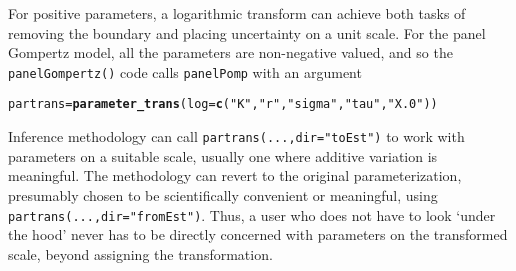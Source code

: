 \documentclass[12pt]{article}\usepackage[]{graphicx}\usepackage[table]{xcolor}
\makeatletter
\newcommand{\hlsng}[1]{\textcolor[rgb]{0.192,0.494,0.8}{#1}}%
\newcommand{\hldef}[1]{\textcolor[rgb]{0.345,0.345,0.345}{#1}}%
\newcommand{\hlkwb}[1]{\textcolor[rgb]{0.69,0.353,0.396}{#1}}%
\newcommand{\hlkwc}[1]{\textcolor[rgb]{0.333,0.667,0.333}{#1}}%
\newcommand{\hlkwd}[1]{\textcolor[rgb]{0.737,0.353,0.396}{\textbf{#1}}}%
\newenvironment{kframe}{%
 \def\at@end@of@kframe{}%
 \ifinner\ifhmode%
  \def\at@end@of@kframe{\end{minipage}}%
  \begin{minipage}{\columnwidth}%
 \fi\fi%
 \def\FrameCommand##1{\hskip\@totalleftmargin \hskip-\fboxsep
 \colorbox{shadecolor}{##1}\hskip-\fboxsep
     \hskip-\linewidth \hskip-\@totalleftmargin \hskip\columnwidth}%
 \MakeFramed {\advance\hsize-\width
   \@totalleftmargin\z@ \linewidth\hsize
   \@setminipage}}%
 {\par\unskip\endMakeFramed%
 \at@end@of@kframe}
\newenvironment{knitrout}{}{} %
\newcommand\code{\texttt}
\makeatother
\begin{document}
For positive parameters, a logarithmic transform can achieve both tasks of removing the boundary and placing uncertainty on a unit scale.
For the panel Gompertz model, all the parameters are non-negative valued, and so the \code{panelGompertz()} code calls \code{panelPomp} with an argument
\begin{knitrout}
\color{fgcolor}\begin{kframe}
\begin{alltt}
\hldef{partrans}\hlkwb{=}\hlkwd{parameter_trans}\hldef{(}\hlkwc{log}\hldef{=}\hlkwd{c}\hldef{(}\hlsng{"K"}\hldef{,}\hlsng{"r"}\hldef{,}\hlsng{"sigma"}\hldef{,}\hlsng{"tau"}\hldef{,}\hlsng{"X.0"}\hldef{))}
\end{alltt}
\end{kframe}
\end{knitrout}
Inference methodology can call \code{partrans(...,dir="toEst")} to work with parameters on a suitable scale, usually one where additive variation is meaningful.
The methodology can revert to the original parameterization, presumably chosen to be scientifically convenient or meaningful, using  \code{partrans(...,dir="fromEst")}.
Thus, a user who does not have to look `under the hood' never has to be directly concerned with parameters on the transformed scale, beyond assigning the transformation.
\end{document}
